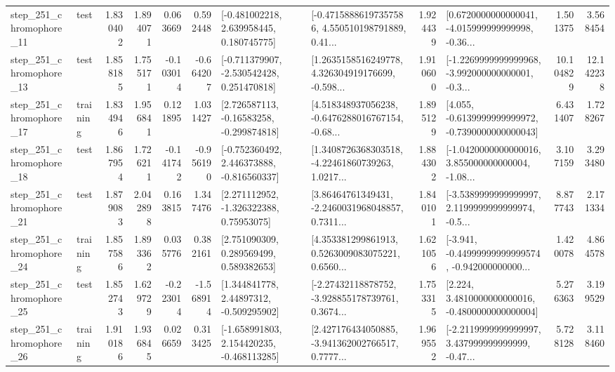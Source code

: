 \begin{tabular}{llrrrrllrlrr}
  step\_251\_chromophore\_11 &      test &      1.830402 &    1.894071 &      0.063669 &  0.592448 &    [-0.481002218, 2.639958445, 0.180745775] &  [-0.47158886197357586, 4.550510198791889, 0.41... &       1.924439 &  [0.6720000000000041, -4.015999999999998, -0.36... &            1.501375 &          3.568454 \\
  step\_251\_chromophore\_13 &      test &      1.858185 &    1.755171 &     -0.103014 & -0.664207 &   [-0.711379907, -2.530542428, 0.251470818] &  [1.2635158516249778, 4.326304919176699, -0.598... &       1.910600 &  [-1.2269999999999968, -3.992000000000001, -0.3... &           10.104829 &         12.142238 \\
  step\_251\_chromophore\_17 &  training &      1.834946 &    1.956841 &      0.121895 &  1.031427 &    [2.726587113, -0.16583258, -0.299874818] &  [4.518348937056238, -0.6476288016767154, -0.68... &       1.895129 &  [4.055, -0.6139999999999972, -0.7390000000000043] &            6.431407 &          1.728267 \\
  step\_251\_chromophore\_18 &      test &      1.867954 &    1.726211 &     -0.141742 & -0.956190 &   [-0.752360492, 2.446373888, -0.816560337] &  [1.3408726368303518, -4.22461860739263, 1.0217... &       1.884302 &  [-1.0420000000000016, 3.855000000000004, -1.08... &            3.107159 &          3.293480 \\
  step\_251\_chromophore\_21 &      test &      1.879083 &    2.042898 &      0.163815 &  1.347476 &     [2.271112952, -1.326322388, 0.75953075] &  [3.86464761349431, -2.2460031968048857, 0.7311... &       1.840101 &  [-3.5389999999999997, 2.1199999999999974, -0.5... &            8.877743 &          2.171334 \\
  step\_251\_chromophore\_24 &  training &      1.857586 &    1.893362 &      0.035776 &  0.382161 &     [2.751090309, 0.289569499, 0.589382653] &  [4.353381299861913, 0.5263009083075221, 0.6560... &       1.621056 &  [-3.941, -0.44999999999999574, -0.942000000000... &            1.420078 &          4.864578 \\
  step\_251\_chromophore\_25 &      test &      1.852743 &    1.629729 &     -0.223014 & -1.568914 &     [1.344841778, 2.44897312, -0.509295902] &  [-2.27432118878752, -3.928855178739761, 0.3674... &       1.753315 &   [2.224, 3.4810000000000016, -0.4800000000000004] &            5.276363 &          3.199529 \\
  step\_251\_chromophore\_26 &  training &      1.910186 &    1.936845 &      0.026659 &  0.313425 &   [-1.658991803, 2.154420235, -0.468113285] &  [2.427176434050885, -3.941362002766517, 0.7777... &       1.969552 &  [-2.2119999999999997, 3.437999999999999, -0.47... &            5.728128 &          3.118460 \\

\end{tabular}
